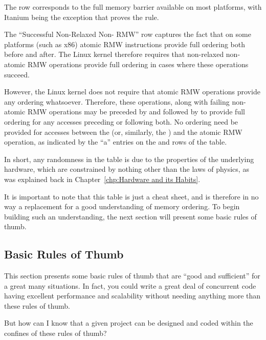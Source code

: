 {	The  row corresponds to the full memory barrier
	available on most platforms, with Itanium being the exception
	that proves the rule.

	The ``Successful Non-Relaxed Non- RMW'' row captures
	the fact that on some platforms (such as x86) atomic RMW instructions
	provide full ordering both before and after.
	The Linux kernel therefore requires that non-relaxed non-
	atomic RMW operations provide full ordering in cases where these
	operations succeed.

	However, the Linux kernel does not require that  atomic
	RMW operations provide any ordering whatsoever.
	Therefore, these operations, along with failing non-
	atomic RMW operations may be preceded by 
	and followed by  to provide full
	ordering for any accesses preceding or following both.
	No ordering need be provided for accesses between the
	 (or, similarly, the
	) and the atomic RMW operation, as
	indicated by the ``a'' entries on the 
	and  rows of the table.

	In short, any randomness in the table is due to the properties
	of the underlying hardware, which are constrained by nothing other
	than the laws of physics, as was explained back in
	Chapter~\ref{chp:Hardware and its Habits}.
} \QuickQuizEnd

It is important to note that this table is just a cheat sheet,
and is therefore in no way a replacement for a good understanding
of memory ordering.
To begin building such an understanding, the next section will
present some basic rules of thumb.

\subsection{Basic Rules of Thumb}
\label{sec:memorder:Basic Rules of Thumb}

This section presents some basic rules of thumb that are ``good and
sufficient'' for a great many situations.
In fact, you could write a great deal of concurrent code having
excellent performance and scalability without needing anything more
than these rules of thumb.

\QuickQuiz{}
	But how can I know that a given project can be designed
	and coded within the confines of these rules of thumb?
 \QuickQuizEnd

